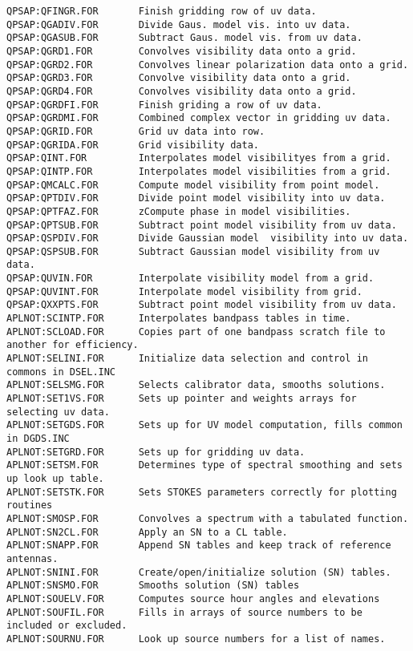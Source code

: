 \begin{verbatim}
QPSAP:QFINGR.FOR       Finish gridding row of uv data.
QPSAP:QGADIV.FOR       Divide Gaus. model vis. into uv data.
QPSAP:QGASUB.FOR       Subtract Gaus. model vis. from uv data.
QPSAP:QGRD1.FOR        Convolves visibility data onto a grid.
QPSAP:QGRD2.FOR        Convolves linear polarization data onto a grid.
QPSAP:QGRD3.FOR        Convolve visibility data onto a grid.
QPSAP:QGRD4.FOR        Convolves visibility data onto a grid.
QPSAP:QGRDFI.FOR       Finish griding a row of uv data.
QPSAP:QGRDMI.FOR       Combined complex vector in gridding uv data.
QPSAP:QGRID.FOR        Grid uv data into row.
QPSAP:QGRIDA.FOR       Grid visibility data.
QPSAP:QINT.FOR         Interpolates model visibilityes from a grid.
QPSAP:QINTP.FOR        Interpolates model visibilities from a grid.
QPSAP:QMCALC.FOR       Compute model visibility from point model.
QPSAP:QPTDIV.FOR       Divide point model visibility into uv data.
QPSAP:QPTFAZ.FOR       zCompute phase in model visibilities.
QPSAP:QPTSUB.FOR       Subtract point model visibility from uv data.
QPSAP:QSPDIV.FOR       Divide Gaussian model  visibility into uv data.
QPSAP:QSPSUB.FOR       Subtract Gaussian model visibility from uv data.
QPSAP:QUVIN.FOR        Interpolate visibility model from a grid.
QPSAP:QUVINT.FOR       Interpolate model visibility from grid.
QPSAP:QXXPTS.FOR       Subtract point model visibility from uv data.
APLNOT:SCINTP.FOR      Interpolates bandpass tables in time.
APLNOT:SCLOAD.FOR      Copies part of one bandpass scratch file to another for efficiency.
APLNOT:SELINI.FOR      Initialize data selection and control in commons in DSEL.INC
APLNOT:SELSMG.FOR      Selects calibrator data, smooths solutions.
APLNOT:SET1VS.FOR      Sets up pointer and weights arrays for selecting uv data.
APLNOT:SETGDS.FOR      Sets up for UV model computation, fills common in DGDS.INC
APLNOT:SETGRD.FOR      Sets up for gridding uv data.
APLNOT:SETSM.FOR       Determines type of spectral smoothing and sets up look up table.
APLNOT:SETSTK.FOR      Sets STOKES parameters correctly for plotting routines
APLNOT:SMOSP.FOR       Convolves a spectrum with a tabulated function.
APLNOT:SN2CL.FOR       Apply an SN to a CL table.
APLNOT:SNAPP.FOR       Append SN tables and keep track of reference antennas.
APLNOT:SNINI.FOR       Create/open/initialize solution (SN) tables.
APLNOT:SNSMO.FOR       Smooths solution (SN) tables
APLNOT:SOUELV.FOR      Computes source hour angles and elevations
APLNOT:SOUFIL.FOR      Fills in arrays of source numbers to be included or excluded.
APLNOT:SOURNU.FOR      Look up source numbers for a list of names.

\end{verbatim}
